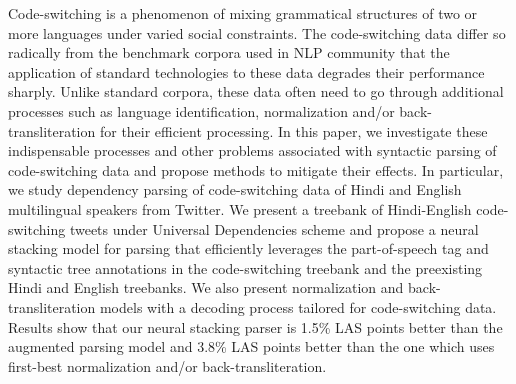 Code-switching is a phenomenon of mixing grammatical structures of two or more languages under varied social constraints. The code-switching data differ so radically from the benchmark corpora used in NLP community that the application of standard technologies to these data degrades their performance sharply. Unlike standard corpora, these data often need to go through additional processes such as language identification, normalization and/or back-transliteration for their efficient processing. In this paper, we investigate these indispensable processes and other problems associated with syntactic parsing of code-switching data and propose methods to mitigate their effects. In particular, we study dependency parsing of code-switching data of Hindi and English multilingual speakers from Twitter. We present a treebank of Hindi-English code-switching tweets under Universal Dependencies scheme and propose a neural stacking model for parsing that efficiently leverages the part-of-speech tag and syntactic tree annotations in the code-switching treebank and the preexisting Hindi and English treebanks. We also present normalization and back-transliteration models with a decoding process tailored for code-switching data. Results show that our neural stacking parser is 1.5\% LAS points better than the augmented parsing model and 3.8\% LAS points better than the one which uses first-best normalization and/or back-transliteration.
